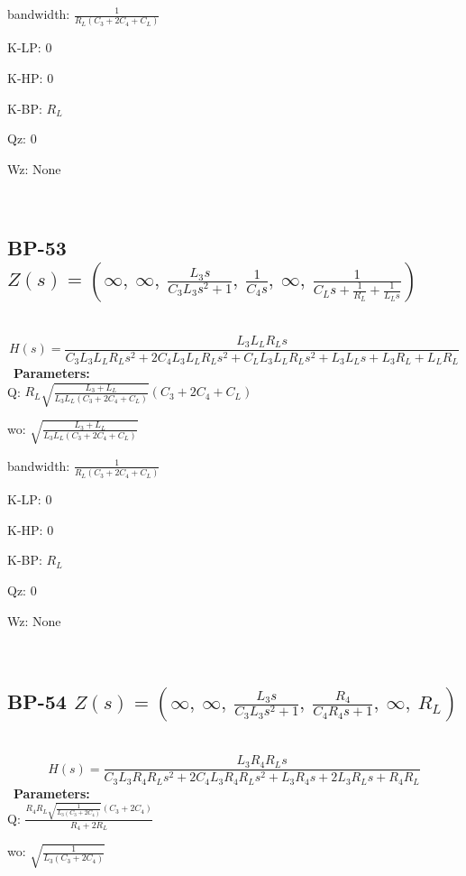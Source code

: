 \documentclass{article}
\begin{document}
bandwidth: $\frac{1}{R_{L} \left(C_{3} + 2 C_{4} + C_{L}\right)}$\ 

K-LP: $0$\ 

K-HP: $0$\ 

K-BP: $R_{L}$\ 

Qz: $0$\ 

Wz: $\text{None}$\ 

\ 

\subsection{BP-53 $Z(s) = \left( \infty, \  \infty, \  \frac{L_{3} s}{C_{3} L_{3} s^{2} + 1}, \  \frac{1}{C_{4} s}, \  \infty, \  \frac{1}{C_{L} s + \frac{1}{R_{L}} + \frac{1}{L_{L} s}}\right)$ } \ 
\textbf{\[H(s) = \frac{L_{3} L_{L} R_{L} s}{C_{3} L_{3} L_{L} R_{L} s^{2} + 2 C_{4} L_{3} L_{L} R_{L} s^{2} + C_{L} L_{3} L_{L} R_{L} s^{2} + L_{3} L_{L} s + L_{3} R_{L} + L_{L} R_{L}}\] } \ 
\textbf{Parameters:}\\ 

Q: $R_{L} \sqrt{\frac{L_{3} + L_{L}}{L_{3} L_{L} \left(C_{3} + 2 C_{4} + C_{L}\right)}} \left(C_{3} + 2 C_{4} + C_{L}\right)$\ 

wo: $\sqrt{\frac{L_{3} + L_{L}}{L_{3} L_{L} \left(C_{3} + 2 C_{4} + C_{L}\right)}}$\ 

bandwidth: $\frac{1}{R_{L} \left(C_{3} + 2 C_{4} + C_{L}\right)}$\ 

K-LP: $0$\ 

K-HP: $0$\ 

K-BP: $R_{L}$\ 

Qz: $0$\ 

Wz: $\text{None}$\ 

\ 

\subsection{BP-54 $Z(s) = \left( \infty, \  \infty, \  \frac{L_{3} s}{C_{3} L_{3} s^{2} + 1}, \  \frac{R_{4}}{C_{4} R_{4} s + 1}, \  \infty, \  R_{L}\right)$ } \ 
\textbf{\[H(s) = \frac{L_{3} R_{4} R_{L} s}{C_{3} L_{3} R_{4} R_{L} s^{2} + 2 C_{4} L_{3} R_{4} R_{L} s^{2} + L_{3} R_{4} s + 2 L_{3} R_{L} s + R_{4} R_{L}}\] } \ 
\textbf{Parameters:}\\ 

Q: $\frac{R_{4} R_{L} \sqrt{\frac{1}{L_{3} \left(C_{3} + 2 C_{4}\right)}} \left(C_{3} + 2 C_{4}\right)}{R_{4} + 2 R_{L}}$\ 

wo: $\sqrt{\frac{1}{L_{3} \left(C_{3} + 2 C_{4}\right)}}$\ 
\end{document}
